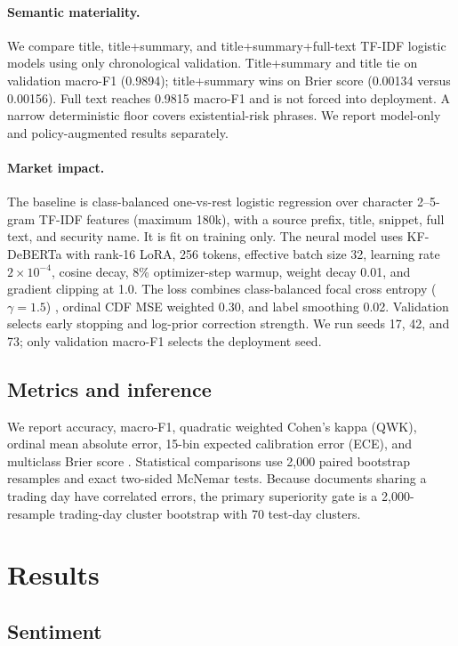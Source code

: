 \documentclass[11pt]{article}
\begin{document}
\paragraph{Semantic materiality.}
We compare title, title+summary, and title+summary+full-text TF-IDF logistic models using only chronological validation. Title+summary and title tie on validation macro-F1 (0.9894); title+summary wins on Brier score (0.00134 versus 0.00156). Full text reaches 0.9815 macro-F1 and is not forced into deployment. A narrow deterministic floor covers existential-risk phrases. We report model-only and policy-augmented results separately.

\paragraph{Market impact.}
The baseline is class-balanced one-vs-rest logistic regression over character 2--5-gram TF-IDF features (maximum 180k), with a source prefix, title, snippet, full text, and security name. It is fit on training only. The neural model uses KF-DeBERTa with rank-16 LoRA, 256 tokens, effective batch size 32, learning rate $2\times10^{-4}$, cosine decay, 8\% optimizer-step warmup, weight decay 0.01, and gradient clipping at 1.0. The loss combines class-balanced focal cross entropy ($\gamma=1.5$) \citep{lin-etal-2017-focal}, ordinal CDF MSE weighted 0.30, and label smoothing 0.02. Validation selects early stopping and log-prior correction strength. We run seeds 17, 42, and 73; only validation macro-F1 selects the deployment seed.

\subsection{Metrics and inference}

We report accuracy, macro-F1, quadratic weighted Cohen's kappa (QWK), ordinal mean absolute error, 15-bin expected calibration error (ECE), and multiclass Brier score \citep{guo-etal-2017-calibration}. Statistical comparisons use 2,000 paired bootstrap resamples and exact two-sided McNemar tests. Because documents sharing a trading day have correlated errors, the primary superiority gate is a 2,000-resample trading-day cluster bootstrap with 70 test-day clusters.

\section{Results}

\subsection{Sentiment}
\end{document}
